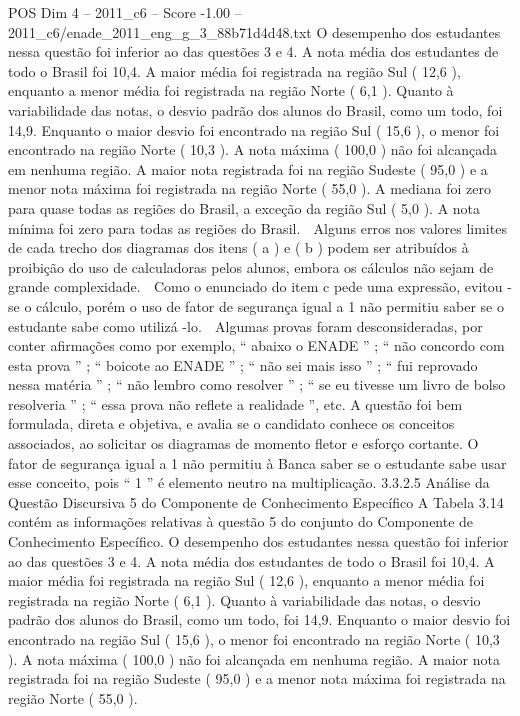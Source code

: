 \begin{textsample}{POS Dim 4 – 2011\_c6 – Score -1.00 – 2011\_c6/enade\_2011\_eng\_g\_3\_88b71d4d48.txt}
O desempenho dos estudantes nessa questão foi inferior ao das questões 3 e 4.
A nota média dos estudantes de todo o Brasil foi 10,4.
A maior média foi registrada na região Sul ( 12,6 ), enquanto a menor média foi registrada na região Norte ( 6,1 ).
Quanto à variabilidade das notas, o desvio padrão dos alunos do Brasil, como um todo, foi 14,9.
Enquanto o maior desvio foi encontrado na região Sul ( 15,6 ), o menor foi encontrado na região Norte ( 10,3 ).
A nota máxima ( 100,0 ) não foi alcançada em nenhuma região.
A maior nota registrada foi na região Sudeste ( 95,0 ) e a menor nota máxima foi registrada na região Norte ( 55,0 ).
A mediana foi zero para quase todas as regiões do Brasil, a exceção da região Sul ( 5,0 ).
A nota mínima foi zero para todas as regiões do Brasil.  Alguns erros nos valores limites de cada trecho dos diagramas dos itens ( a ) e ( b ) podem ser atribuídos à proibição do uso de calculadoras pelos alunos, embora os cálculos não sejam de grande complexidade.  Como o enunciado do item c pede uma expressão, evitou -se o cálculo, porém o uso de fator de segurança igual a 1 não permitiu saber se o estudante sabe como utilizá -lo.  Algumas provas foram desconsideradas, por conter afirmações como por exemplo, “ abaixo o ENADE ” ; “ não concordo com esta prova ” ; “ boicote ao ENADE ” ; “ não sei mais isso ” ; “ fui reprovado nessa matéria ” ; “ não lembro como resolver ” ; “ se eu tivesse um livro de bolso resolveria ” ; “ essa prova não reflete a realidade ”, etc.
A questão foi bem formulada, direta e objetiva, e avalia se o candidato conhece os conceitos associados, ao solicitar os diagramas de momento fletor e esforço cortante.
O fator de segurança igual a 1 não permitiu à Banca saber se o estudante sabe usar esse conceito, pois “ 1 ” é elemento neutro na multiplicação. 3.3.2.5 Análise da Questão Discursiva 5 do Componente de Conhecimento Específico A Tabela 3.14 contém as informações relativas à questão 5 do conjunto do Componente de Conhecimento Específico.
O desempenho dos estudantes nessa questão foi inferior ao das questões 3 e 4.
A nota média dos estudantes de todo o Brasil foi 10,4.
A maior média foi registrada na região Sul ( 12,6 ), enquanto a menor média foi registrada na região Norte ( 6,1 ).
Quanto à variabilidade das notas, o desvio padrão dos alunos do Brasil, como um todo, foi 14,9.
Enquanto o maior desvio foi encontrado na região Sul ( 15,6 ), o menor foi encontrado na região Norte ( 10,3 ).
A nota máxima ( 100,0 ) não foi alcançada em nenhuma região.
A maior nota registrada foi na região Sudeste ( 95,0 ) e a menor nota máxima foi registrada na região Norte ( 55,0 ).

\end{textsample}

